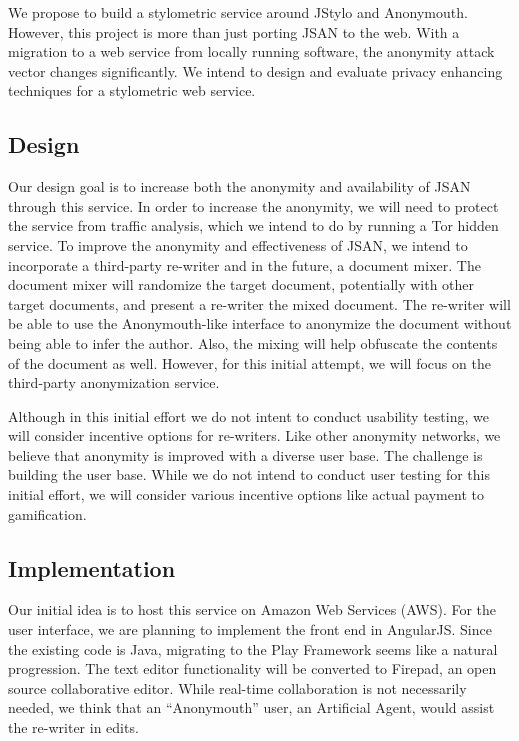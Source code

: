 \documentclass[letterpaper]{article}
\begin{document}
We propose to build a stylometric service around JStylo and
Anonymouth.  However, this project is more than just porting JSAN to
the web.  With a migration to a web service from locally running
software, the anonymity attack vector changes significantly.  We
intend to design and evaluate privacy enhancing techniques for
a stylometric web service.

\subsection{Design}

Our design goal is to increase both the anonymity and availability of
JSAN through this service.  In order to increase the anonymity, we
will need to protect the service from traffic analysis, which we
intend to do by running a Tor hidden service.  To improve the
anonymity and effectiveness of JSAN, we intend to incorporate a
third-party re-writer and in the future, a document mixer.  The
document mixer will randomize the target document, potentially with
other target documents, and present a re-writer the mixed document.
The re-writer will be able to use the Anonymouth-like interface to
anonymize the document without being able to infer the author.  Also,
the mixing will help obfuscate the contents of the document as well.
However, for this initial attempt, we will focus on the third-party
anonymization service.

Although in this initial effort we do not intent to conduct usability
testing, we will consider incentive options for re-writers.  Like
other anonymity networks, we believe that anonymity is improved with a
diverse user base.  The challenge is building the user base.  While we
do not intend to conduct user testing for this initial effort, we will
consider various incentive options like actual payment to
gamification.

\subsection{Implementation}

Our initial idea is to host this service on Amazon Web Services
(AWS).  For the user interface, we are planning to implement the front
end in AngularJS.  Since the existing code is Java, migrating to the
Play Framework seems like a natural progression.  The text editor
functionality will be converted to Firepad, an open source
collaborative editor.  While real-time collaboration is not
necessarily needed, we think that an ``Anonymouth'' user, an
Artificial Agent, would assist the re-writer in edits.
\end{document}
